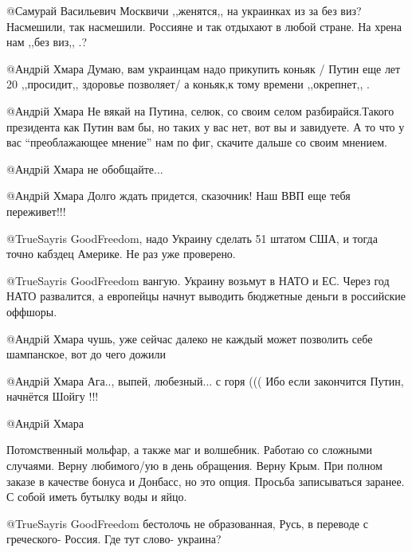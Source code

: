 \begin{itemize}
\begin{itemize}

@Самурай Васильевич  Москвичи ,,женятся,, на украинках из за без виз?
Насмешили, так насмешили. Россияне и так отдыхают в любой стране. На хрена нам
,,без виз,, .?


@Андрiй Хмара  Думаю, вам украинцам надо прикупить коньяк / Путин еще лет 20
,,просидит,, здоровье позволяет/ а коньяк,к тому времени ,,окрепнет,, .


@Андрiй Хмара  Не вякай на Путина, селюк, со своим селом разбирайся.Такого
президента как Путин вам бы, но таких у вас нет, вот вы и завидуете. А то что
у вас \enquote{преоблажающее мнение}  нам по фиг, скачите дальше со своим мнением.


@Андрiй Хмара  не обобщайте...


@Андрiй Хмара  Долго ждать придется, сказочник! Наш ВВП еще тебя переживет!!!


@TrueSayris GoodFreedom, надо Украину сделать 51 штатом США, и тогда точно
кабздец Америке. Не раз уже проверено.


@TrueSayris GoodFreedom  вангую. Украину возьмут в НАТО и ЕС. Через год НАТО
развалится, а европейцы начнут выводить бюджетные деньги в российские оффшоры.


@Андрiй Хмара  чушь, уже сейчас далеко не каждый может позволить себе
шампанское, вот до чего дожили


@Андрiй Хмара  Ага.., выпей, любезный... с горя ((( Ибо если закончится Путин,
начнётся Шойгу !!!

 @Андрiй Хмара  

Потомственный мольфар, а также маг и волшебник. 
Работаю со сложными случаями.
Верну любимого/ую в день обращения. Верну Крым. При полном заказе в качестве бонуса и Донбасс, но это опция.
Просьба записываться заранее. С собой иметь бутылку воды и яйцо.


@TrueSayris GoodFreedom  бестолочь не образованная, Русь, в переводе с
греческого- Россия. Где тут слово- украина?


\end{itemize}
\end{itemize}
